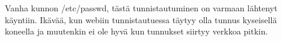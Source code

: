 Vanha kunnon /etc/passwd, tästä tunnistautuminen on varmaan lähtenyt käyntiin. Ikävää, kun webiin tunnistautuessa täytyy olla tunnus kyseisellä koneella ja muutenkin ei ole hyvä kun tunnukset siirtyy verkkoa pitkin.